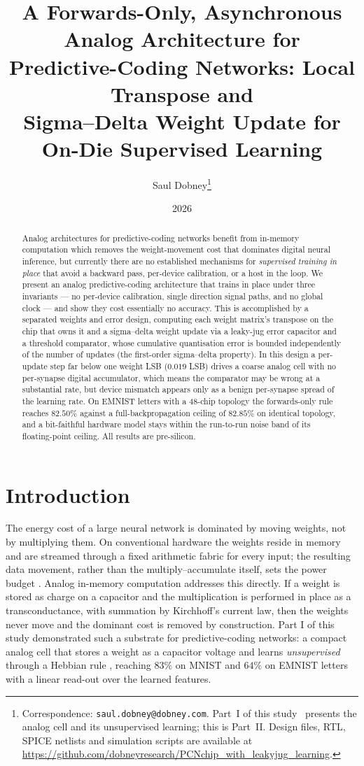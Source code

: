 \documentclass[11pt]{article}
\title{\bfseries A Forwards-Only, Asynchronous Analog Architecture for\\
Predictive-Coding Networks: Local Transpose and\\
Sigma--Delta Weight Update for On-Die Supervised Learning}
\author{Saul Dobney\thanks{Correspondence: \texttt{saul.dobney@dobney.com}.
Part~I of this study~\cite{dobney2026analog} presents the analog cell and its unsupervised
learning; this is Part~II. Design files, RTL, SPICE netlists and simulation scripts are available at
\url{https://github.com/dobneyresearch/PCNchip_with_leakyjug_learning}.}}
\date{2026}
\begin{document}
\maketitle

\begin{abstract}
Analog architectures for predictive-coding networks benefit from
in-memory computation which removes the weight-movement cost that
dominates digital neural inference, but currently there are no
established mechanisms for \emph{supervised training in place} that
avoid a backward pass, per-device calibration, or a host in the loop. We
present an analog predictive-coding architecture that trains in place
under three invariants --- no per-device calibration, single direction
signal paths, and no global clock --- and show they cost essentially no
accuracy. This is accomplished by a separated weights and error design,
computing each weight matrix's transpose on the chip that owns it and a
sigma--delta weight update via a leaky-jug error capacitor and a
threshold comparator, whose cumulative quantisation error is bounded
independently of the number of updates (the first-order sigma--delta
property). In this design a per-update step far below one weight LSB
(\(0.019\) LSB) drives a coarse analog cell with no per-synapse digital
accumulator, which means the comparator may be wrong at a substantial
rate, but device mismatch appears only as a benign per-synapse spread of
the learning rate. On EMNIST letters with a 48-chip topology the
forwards-only rule reaches \(82.50\%\) against a full-backpropagation
ceiling of \(82.85\%\) on identical topology, and a bit-faithful
hardware model stays within the run-to-run noise band of its
floating-point ceiling. All results are pre-silicon.
\end{abstract}

\hypertarget{sec:intro}{%
\section{Introduction}\label{sec:intro}}

The energy cost of a large neural network is dominated by moving
weights, not by multiplying them. On conventional hardware the weights
reside in memory and are streamed through a fixed arithmetic fabric for
every input; the resulting data movement, rather than the
multiply--accumulate itself, sets the power budget
\cite{horowitz2014computing, mead1989analog, ambrogio2018equivalent}.
Analog in-memory computation addresses this directly. If a weight is
stored as charge on a capacitor and the multiplication is performed in
place as a transconductance, with summation by Kirchhoff's current law,
then the weights never move and the dominant cost is removed by
construction. Part I of this study \cite{dobney2026analog} demonstrated
such a substrate for predictive-coding networks: a compact analog cell
that stores a weight as a capacitor voltage and learns
\emph{unsupervised} through a Hebbian rule \cite{Sanger1989}, reaching
\(83\%\) on MNIST and \(64\%\) on EMNIST letters with a linear read-out
over the learned features.
\end{document}
